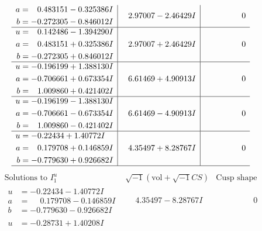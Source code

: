 \documentclass[1p]{elsarticle_modified}
\theoremstyle{definition}
\newcommand{\I}{\sqrt{-1}}
\begin{document}
$$\begin{array}{c|c|c}
\begin{aligned}
a &= \phantom{-}0.483151 - 0.325386 I \\
b &= -0.272305 - 0.846012 I\end{aligned}
 & \phantom{-}2.97007 - 2.46429 I & \phantom{-0.000000 } 0 \\ \hline\begin{aligned}
u &= \phantom{-}0.142486 - 1.394290 I \\
a &= \phantom{-}0.483151 + 0.325386 I \\
b &= -0.272305 + 0.846012 I\end{aligned}
 & \phantom{-}2.97007 + 2.46429 I & \phantom{-0.000000 } 0 \\ \hline\begin{aligned}
u &= -0.196199 + 1.388130 I \\
a &= -0.706661 + 0.673354 I \\
b &= \phantom{-}1.009860 + 0.421402 I\end{aligned}
 & \phantom{-}6.61469 + 4.90913 I & \phantom{-0.000000 } 0 \\ \hline\begin{aligned}
u &= -0.196199 - 1.388130 I \\
a &= -0.706661 - 0.673354 I \\
b &= \phantom{-}1.009860 - 0.421402 I\end{aligned}
 & \phantom{-}6.61469 - 4.90913 I & \phantom{-0.000000 } 0 \\ \hline\begin{aligned}
u &= -0.22434 + 1.40772 I \\
a &= \phantom{-}0.179708 + 0.146859 I \\
b &= -0.779630 + 0.926682 I\end{aligned}
 & \phantom{-}4.35497 + 8.28767 I & \phantom{-0.000000 } 0\\
 \hline 
 \end{array}$$\newpage$$\begin{array}{c|c|c}  
\text{Solutions to }I^u_{1}& \I (\text{vol} + \sqrt{-1}CS) & \text{Cusp shape}\\
 \hline 
\begin{aligned}
u &= -0.22434 - 1.40772 I \\
a &= \phantom{-}0.179708 - 0.146859 I \\
b &= -0.779630 - 0.926682 I\end{aligned}
 & \phantom{-}4.35497 - 8.28767 I & \phantom{-0.000000 } 0 \\ \hline\begin{aligned}
u &= -0.28731 + 1.40208 I \\

\end{aligned}
\end{array}$$
\end{document}

